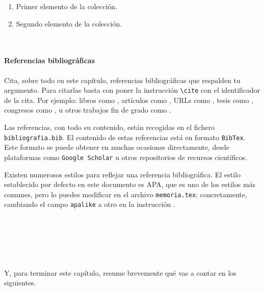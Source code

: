 \begin{enumerate}
 \item Primer elemento de la colección.
 \item Segundo elemento de la colección.
\end{enumerate}\

\paragraph{Referencias bibliográficas}
\label{sec:referencias}

Cita, sobre todo en este capítulo, referencias bibliográficas que respalden tu argumento. Para citarlas basta con poner la instrucción \verb|\cite| con el identificador de la cita. Por ejemplo: libros como \cite{vega12e}, artículos como \cite{vega19b}, URLs como \cite{vega19a}, tesis como \cite{vega18b}, congresos como \cite{vega18a}, u otros trabajos fin de grado como \cite{vega08b}.

Las referencias, con todo su contenido, están recogidas en el fichero \texttt{bibliografia.bib}. El contenido de estas referencias está en formato \texttt{BibTex}. Este formato se puede obtener en muchas ocasiones directamente, desde plataformas como \texttt{Google Scholar} u otros repositorios de recursos científicos.

Existen numerosos estilos para reflejar una referencia bibliográfica. El estilo establecido por defecto en este documento es APA, que es uno de los estilos más comunes, pero lo puedes modificar en el archivo \texttt{memoria.tex}; concretamente, cambiando el campo \verb|apalike| a otro en la instrucción \verb||. 

\

\

\

Y, para terminar este capítulo, resume brevemente qué vas a contar en los siguientes.
